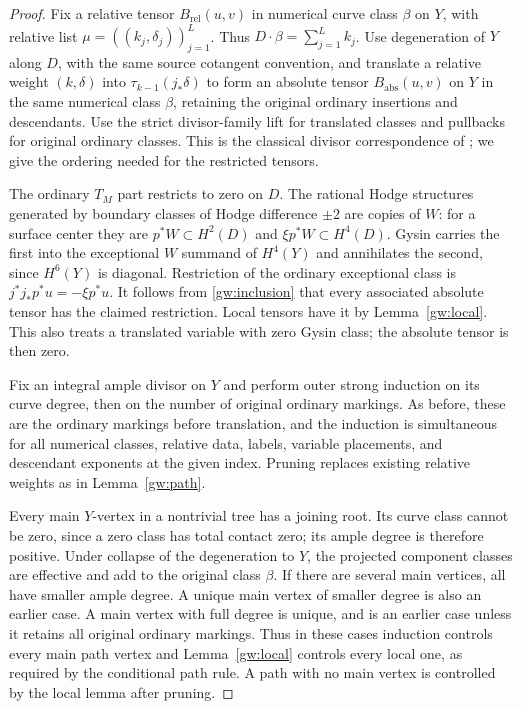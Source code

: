 \begin{proof}
Fix a relative tensor $B_{\mathrm{rel}}(u,v)$ in numerical curve class
$\beta$ on $Y$, with relative list
$\mu=((k_j,\delta_j))_{j=1}^{L}$.  Thus
$D\cdot\beta=\sum_{j=1}^{L}k_j$.
Use degeneration of $Y$ along $D$, with the same source cotangent convention,
and translate a relative weight $(k,\delta)$ into
$\tau_{k-1}(j_*\delta)$ to form an absolute tensor
$B_{\mathrm{abs}}(u,v)$ on $Y$ in the same numerical class $\beta$,
retaining the original ordinary insertions and descendants.
Use the strict divisor-family lift for translated
classes and pullbacks for original ordinary classes.  This is the
classical divisor correspondence of \cite[Section~2.4, Lemma~4]{MP06}; we
give the ordering needed for the restricted tensors.

The ordinary $T_M$ part restricts to zero on $D$.  The rational Hodge
structures generated by boundary classes of Hodge difference $\pm2$ are
copies of $W$: for a surface center they are
$p^*W\subset H^2(D)$ and $\xi p^*W\subset H^4(D)$.
Gysin carries the first into the exceptional $W$ summand of $H^4(Y)$ and
annihilates the second, since $H^6(Y)$ is diagonal.  Restriction of the
ordinary exceptional class is $j^*j_*p^*u=-\xi p^*u$.
It follows from \eqref{gw:inclusion} that every associated absolute tensor
has the claimed restriction.  Local tensors have it by
Lemma~\ref{gw:local}.  This also treats a translated variable with zero
Gysin class; the absolute tensor is then zero.

Fix an integral ample divisor on $Y$ and perform outer strong induction
on its curve degree, then on the number of original ordinary markings.
As before, these are the ordinary markings before translation, and the
induction is simultaneous for all numerical classes, relative data,
labels, variable placements, and descendant exponents at the given index.
Pruning replaces existing relative weights as in Lemma~\ref{gw:path}.

Every main $Y$-vertex in a nontrivial tree has a joining root.  Its curve
class cannot be zero, since a zero class has total contact zero; its ample
degree is therefore positive.  Under collapse of the degeneration to $Y$,
the projected component classes are effective and add to the original
class $\beta$.  If there are several main vertices, all have smaller ample
degree.  A unique main vertex of smaller degree is also an earlier case.
A main vertex with full degree is unique, and is an earlier case
unless it retains all original ordinary markings.  Thus in these cases
induction controls every main path vertex and Lemma~\ref{gw:local}
controls every local one, as required by the conditional path rule.
A path with no main vertex is controlled by the local lemma after pruning.


\end{proof}
